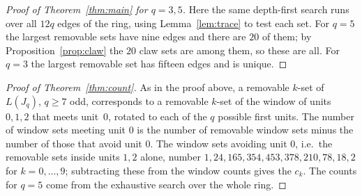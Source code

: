 \documentclass[11pt]{amsart}
\theoremstyle{remark}
\begin{document}
\begin{proof}[Proof of Theorem~\ref{thm:main} for $q=3,5$]
Here the same depth-first search runs over all $12q$ edges of the ring, using Lemma~\ref{lem:trace} to test each
set. For $q=5$ the largest removable sets have nine edges and there are $20$ of them; by
Proposition~\ref{prop:claw} the $20$ claw sets are among them, so these are all. For $q=3$ the largest removable
set has fifteen edges and is unique.
\end{proof}

\begin{proof}[Proof of Theorem~\ref{thm:count}]
As in the proof above, a removable $k$-set of $L(J_q)$, $q\ge7$ odd, corresponds to a removable $k$-set of the
window of units $0,1,2$ that meets unit~$0$, rotated to each of the $q$ possible first units. The number of window
sets meeting unit $0$ is the number of removable window sets minus the number of those that avoid unit $0$.
The window sets avoiding unit $0$, i.e.\ the removable sets inside units $1,2$ alone, number
$1,24,165,354,453,378,210,78,18,2$ for $k=0,\dots,9$; subtracting these from the window counts gives the $c_k$.
The counts for $q=5$ come from the exhaustive search over the whole ring.
\end{proof}
\end{document}
